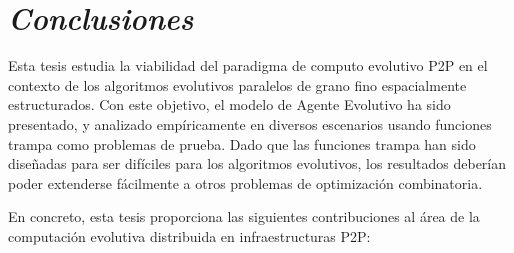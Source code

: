 

\chapter{\textit{Conclusiones}}
\label{cap:conclusiones}

Esta tesis estudia la viabilidad del paradigma de computo evolutivo P2P en el contexto de los algoritmos evolutivos paralelos de grano fino espacialmente estructurados. Con este objetivo, el modelo de Agente Evolutivo ha sido presentado, y analizado emp\'iricamente en diversos escenarios  usando funciones trampa como problemas de prueba. Dado que las funciones trampa han sido dise\~nadas para ser dif\'iciles para los algoritmos evolutivos, los resultados deber\'ian poder extenderse f\'acilmente a otros problemas de optimizaci\'on combinatoria.

En concreto, esta tesis proporciona las siguientes contribuciones al \'area de la computaci\'on evolutiva distribuida en infraestructuras P2P:


